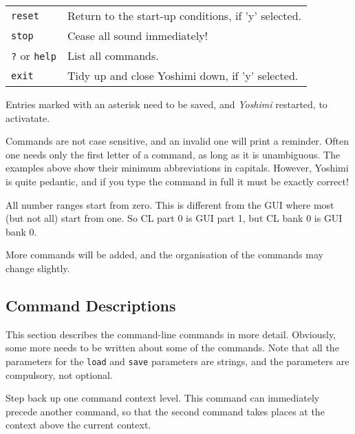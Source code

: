 \begin{table}[H]
\begin{tabular}{l l}
         \texttt{reset} &
            Return to the start-up conditions, if 'y' selected. \\

         \texttt{stop} &
            Cease all sound immediately! \\

         \texttt{?} or \texttt{help} &
            List all commands. \\

         \texttt{exit} &
            Tidy up and close Yoshimi down, if 'y' selected. \\

      \end{tabular}
   \end{table}

   Entries marked with an asterisk need to be saved, and \textsl{Yoshimi}
   restarted, to activatate.

   Commands are not case sensitive, and an invalid one will print a reminder.
   Often one needs only the first letter of a command, as long as it is
   unambiguous. The examples above show their minimum abbreviations in capitals.
   However, Yoshimi is quite pedantic, and if you type the command in full it
   must be exactly correct!

   All number ranges start from zero. This is different from the GUI where most
   (but not all) start from one. So CL part 0 is GUI part 1, but CL bank 0 is
   GUI bank 0.

   More commands will be added, and the organisation of the commands
   may change slightly.

\subsection{Command Descriptions}
\label{subsec:command_line_command_descriptions}

   This section describes the command-line commands in more detail.
   Obviously, some more needs to be written about some of the commands.
   Note that all the parameters for the \texttt{load} and \texttt{save}
   parameters are strings, and the parameters are compulsory, not optional.

   \setcounter{ItemCounter}{0}      %

      Step back up one command context level.
      This command can immediately precede another command, so that the second
      command takes places at the context above the current context.

